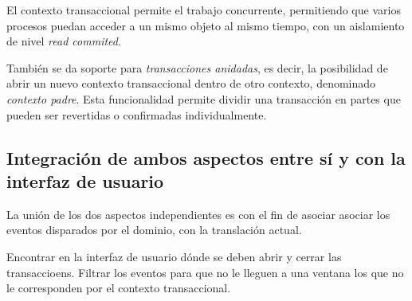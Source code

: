 	El contexto transaccional permite el trabajo concurrente, permitiendo que
	varios procesos puedan acceder a un mismo objeto al mismo
	tiempo, con un aislamiento de nivel \emph{read commited}.
	 
	También se da soporte para \emph{transacciones anidadas}, es decir, la
	posibilidad de abrir un nuevo contexto transaccional dentro de otro contexto,
	denominado \emph{contexto padre}.
	Esta funcionalidad permite dividir una transacción en partes que pueden ser
	revertidas o confirmadas individualmente.
	
\subsection{Integración de ambos aspectos entre sí y con la interfaz de usuario}
\label{sec:Union}
La unión de los dos aspectos independientes es con el fin de asociar asociar los
eventos disparados por el dominio, con la translación actual.
 
Encontrar en la interfaz de usuario dónde se deben abrir y cerrar las
transaccioens.
Filtrar los eventos para que no le lleguen a una ventana los que no le
corresponden por el contexto transaccional.
